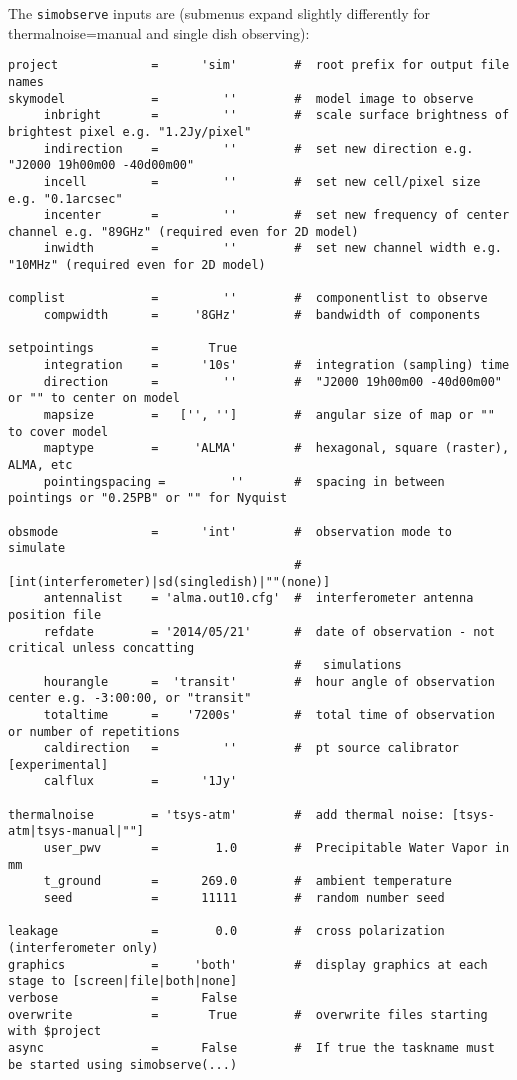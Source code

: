 The {\tt simobserve} inputs are (submenus expand slightly differently for thermalnoise=manual and single dish observing):
\small
\begin{verbatim}
project             =      'sim'        #  root prefix for output file names
skymodel            =         ''        #  model image to observe
     inbright       =         ''        #  scale surface brightness of brightest pixel e.g. "1.2Jy/pixel"
     indirection    =         ''        #  set new direction e.g. "J2000 19h00m00 -40d00m00"
     incell         =         ''        #  set new cell/pixel size e.g. "0.1arcsec"
     incenter       =         ''        #  set new frequency of center channel e.g. "89GHz" (required even for 2D model)
     inwidth        =         ''        #  set new channel width e.g. "10MHz" (required even for 2D model)

complist            =         ''        #  componentlist to observe
     compwidth      =     '8GHz'        #  bandwidth of components

setpointings        =       True        
     integration    =      '10s'        #  integration (sampling) time
     direction      =         ''        #  "J2000 19h00m00 -40d00m00" or "" to center on model
     mapsize        =   ['', '']        #  angular size of map or "" to cover model
     maptype        =     'ALMA'        #  hexagonal, square (raster), ALMA, etc
     pointingspacing =         ''       #  spacing in between pointings or "0.25PB" or "" for Nyquist

obsmode             =      'int'        #  observation mode to simulate
                                        #   [int(interferometer)|sd(singledish)|""(none)]
     antennalist    = 'alma.out10.cfg'  #  interferometer antenna position file
     refdate        = '2014/05/21'      #  date of observation - not critical unless concatting
                                        #   simulations
     hourangle      =  'transit'        #  hour angle of observation center e.g. -3:00:00, or "transit"
     totaltime      =    '7200s'        #  total time of observation or number of repetitions
     caldirection   =         ''        #  pt source calibrator [experimental]
     calflux        =      '1Jy'        

thermalnoise        = 'tsys-atm'        #  add thermal noise: [tsys-atm|tsys-manual|""]
     user_pwv       =        1.0        #  Precipitable Water Vapor in mm
     t_ground       =      269.0        #  ambient temperature
     seed           =      11111        #  random number seed

leakage             =        0.0        #  cross polarization (interferometer only)
graphics            =     'both'        #  display graphics at each stage to [screen|file|both|none]
verbose             =      False        
overwrite           =       True        #  overwrite files starting with $project
async               =      False        #  If true the taskname must be started using simobserve(...)
\end{verbatim}
\normalsize

